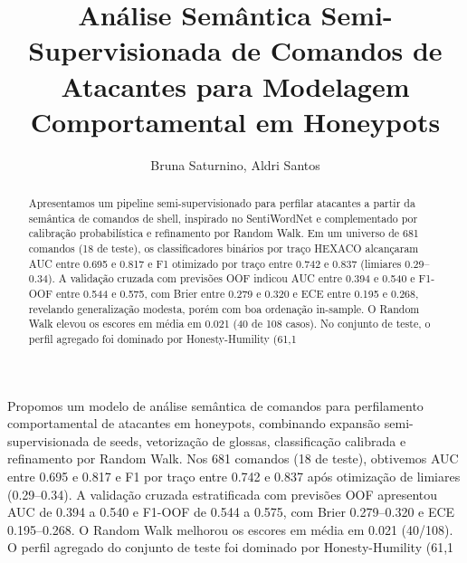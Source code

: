 \documentclass[12pt]{article}
\title{Análise Semântica Semi-Supervisionada de Comandos de Atacantes para Modelagem Comportamental em Honeypots}
\author{Bruna Saturnino\inst{1},   
Aldri Santos\inst{1}}
\begin{document}
 
\maketitle

\begin{abstract}
Apresentamos um pipeline semi-supervisionado para perfilar atacantes a partir da semântica de comandos de shell, inspirado no SentiWordNet e complementado por calibração probabilística e refinamento por Random Walk. Em um universo de 681 comandos (18 de teste), os classificadores binários por traço HEXACO alcançaram AUC entre 0.695 e 0.817 e F1 otimizado por traço entre 0.742 e 0.837 (limiares 0.29--0.34). A validação cruzada com previsões OOF indicou AUC entre 0.394 e 0.540 e F1-OOF entre 0.544 e 0.575, com Brier entre 0.279 e 0.320 e ECE entre 0.195 e 0.268, revelando generalização modesta, porém com boa ordenação in-sample. O Random Walk elevou os escores em média em 0.021 (40 de 108 casos). No conjunto de teste, o perfil agregado foi dominado por Honesty-Humility (61,1%
\end{abstract}

\begin{resumo}
Propomos um modelo de análise semântica de comandos para perfilamento comportamental de atacantes em honeypots, combinando expansão semi-supervisionada de seeds, vetorização de glossas, classificação calibrada e refinamento por Random Walk. Nos 681 comandos (18 de teste), obtivemos AUC entre 0.695 e 0.817 e F1 por traço entre 0.742 e 0.837 após otimização de limiares (0.29--0.34). A validação cruzada estratificada com previsões OOF apresentou AUC de 0.394 a 0.540 e F1-OOF de 0.544 a 0.575, com Brier 0.279--0.320 e ECE 0.195--0.268. O Random Walk melhorou os escores em média em 0.021 (40/108). O perfil agregado do conjunto de teste foi dominado por Honesty-Humility (61,1%
\end{resumo}
\end{document}
